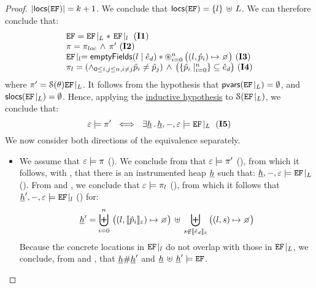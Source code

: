 \begin{proof}
\noindent{}  $\vert {\sf locs}(\mathtt{EF}) \vert = k+1$. We conclude that 
${\sf locs}(\mathtt{EF}) = \{ l \} \, \uplus \, L$. We can therefore conclude that: 
$$
\begin{array}{l}
\efs = \efproj{\efs}{L} \sep \ \efproj{\efs}{\loc} \text{ (\ieq{1})}
%
\\
%
\pc = \pc_{loc} \, \wedge \, \pc' \text{ (\ieq{2})}
%
\\ 
%
 \efproj{\efs}{\loc} = \emptyfields{\loc}{\sexpr_d} \sep  \oast_{i = 0}^{n} \, \big((l, \sexprp_i) \mapsto \none\big) \text{ (\ieq{3})}
%
\\ 
\pc_{\loc} = (\wedge_{0 \leq i, j \leq n, i \neq j} \sexprp_i \neq \sexprp_j)
		       \, \wedge \,  \big(\{  \sexprp_i \mid_{i = 0}^n \} \subseteq \sexpr_d \big) \text{ (\ieq{4})}
\end{array}
$$
where $\pi' = {\cal S}(\theta){\mathtt{EF}\!\mid_{L}}$. It follows from the hypothesis 
that ${\sf pvars}(\mathtt{EF}\!\mid_{L}) = \emptyset$, and ${\sf slocs}(\mathtt{EF}\!\mid_{L}) = \emptyset$.
Hence, applying the \underline{inductive hypothesis} to ${\cal S}(\mathtt{EF}\!\mid_{L})$, 
we conclude that: 
$$
  \senv \satisfies \pc' \ \iff \ 
       \exists \iheap \, . \, \iheap, -, \senv \satisfies \efproj{\efs}{L} \text{ (\ieq{5})}
$$
We now consider both directions of the equivalence separately. 
\begin{itemize}
	\item {} We assume that $\varepsilon \models \pi$ (). We conclude from 
	 that $\varepsilon \models \pi'$ (\ieq{7}), from which it follows, with \ieq{5},  that there is an 
	 instrumented heap $\underline{h}$ such that: $\underline{h}, -, \varepsilon \models \mathtt{EF}\!\mid_{L}$ (\ieq{8}). 
	From \ieq{6} and \ieq{2}, we conclude that  $\varepsilon \models \pi_{l}$ (\ieq{9}), from which 
	it follows that $\underline{h}', -, \varepsilon \models \mathtt{EF}\!\mid_{l}$ (\ieq{10}) for: 
	$$
	  \iheap' =   \biguplus_{i = 0}^{n} \, \big((l, \symbeval{\sexprp_i}{\senv}) \mapsto  \none \big) 
	       \dunion \biguplus_{\jstring \not\in \symbeval{\sexpr_d}{\senv}} \big((l, \jstring) \mapsto \none \big) 
	$$ %
	Because the concrete locations in $\mathtt{EF}\!\mid_{l}$ do 
	not overlap with those in $\mathtt{EF}\!\mid_{L}$, we conclude, from  and , that 
	$\underline{h} \# \underline{h}'$ and $\underline{h} \, \uplus \, \underline{h}' \models \mathtt{EF}$. 
	\vspace{4pt}
	

\end{itemize}
\end{proof}
